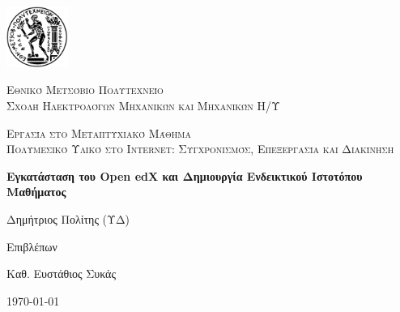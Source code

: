\documentclass[12pt]{report}
\newcommand\blankpage{%
    \null
    \thispagestyle{empty}%
    \addtocounter{page}{-1}%
    \newpage}
\begin{document}

\hypersetup{pageanchor=false}

\begin{titlepage}
  \centering
  \includegraphics[width=0.15\textwidth]{pyrforos}\par\vspace{1cm}
  {\scshape\LARGE Εθνικό Μετσόβιο Πολυτεχνείο\\
  Σχολή Ηλεκτρολόγων Μηχανικών και Μηχανικών Η/Υ\par}
  \vspace{1cm}
  {\scshape\Large Εργασία στο Μεταπτυχιακό Μάθημα\\
  Πολυμεσικό Υλικό στο Internet: Συγχρονισμός, Επεξεργασία και Διακίνηση\par}
  \vspace{1.5cm}
  {\Large\bfseries Εγκατάσταση του \textlatin{Open edX} και Δημιουργία Ενδεικτικού Ιστοτόπου Μαθήματος\par}
  \vspace{2cm}
  {\large Δημήτριος Πολίτης (ΥΔ)\par}
  \vfill
  Επιβλέπων \par
  Καθ. Ευστάθιος Συκάς

  \vfill

  {\large \today\par}
  \afterpage{\blankpage}
\end{titlepage}

\tableofcontents
\thispagestyle{empty}

\listoffigures
\thispagestyle{empty}

\begin{abstract}
Στο παρόν παρουσιάζεται η λειτουργία και η διαδικασία ανάπτυξης ενός μαθήματος στην πλατφόρμα \textlatin{Open-EDX}. Αρχικά  γίνεται αναφορά στην εν λόγω πλατφόρμα ηλεκτρονικής μάθησης και στη συνέχεια περιγράφεται αναλυτικά η διαδικασία εγκατάστασης της, με τη χρήση αυτοματοποιημένων εργαλείων (\textlatin{ansible, vagrant}). Τέλος περιγράφεται ο τρόπος δημιουργίας εντός τής πλατφόρμας, ενός ενδεικτικού ιστοτόπου μαθήματος. Η εργασία είναι διαθέσιμη από το σύνδεσμο \textlatin{\url{https://github.com/dpolitis/open-edx-install}}.

\vspace{10mm}

\noindent \textbf{Λέξεις κλειδιά:} Ηλεκτρονική Μάθηση, Ανοιχτός Κώδικας, Διαδίκτυο.
\end{abstract}
\end{document}
